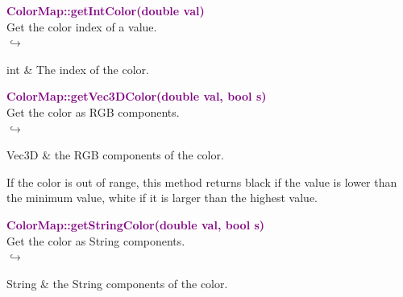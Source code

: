 \textcolor{purple}{\textbf{ColorMap::getIntColor(double val)}}\label{ColorMap::getIntColor(double val)}\\
Get the color index of a value.\\ \hspace*{5mm}$\hookrightarrow$
\vspace*{-2em}\begin{tcolorbox}[grow to left by=-1cm, width=\textwidth-1cm,myArgs,tabularx={l|R}]
 int & The index of the color.
\end{tcolorbox}

\begin{tcolorbox}[width=\textwidth,myArgs,tabularx={ll|R}]

\end{tcolorbox}


\textcolor{purple}{\textbf{ColorMap::getVec3DColor(double val, bool s)}}\label{ColorMap::getVec3DColor(double val, bool s)}\\
Get the color as RGB components.\\ \hspace*{5mm}$\hookrightarrow$
\vspace*{-2em}\begin{tcolorbox}[grow to left by=-1cm, width=\textwidth-1cm,myArgs,tabularx={l|R}]
 Vec3D & the RGB components of the color.
\end{tcolorbox}

\begin{tcolorbox}[width=\textwidth,myArgs,tabularx={ll|R}]


\end{tcolorbox}

If the color is out of range, this method returns black if the value is lower than the minimum value, white if it is larger than the highest value.

\textcolor{purple}{\textbf{ColorMap::getStringColor(double val, bool s)}}\label{ColorMap::getStringColor(double val, bool s)}\\
Get the color as String components.\\ \hspace*{5mm}$\hookrightarrow$
\vspace*{-2em}\begin{tcolorbox}[grow to left by=-1cm, width=\textwidth-1cm,myArgs,tabularx={l|R}]
 String & the String components of the color.
\end{tcolorbox}

